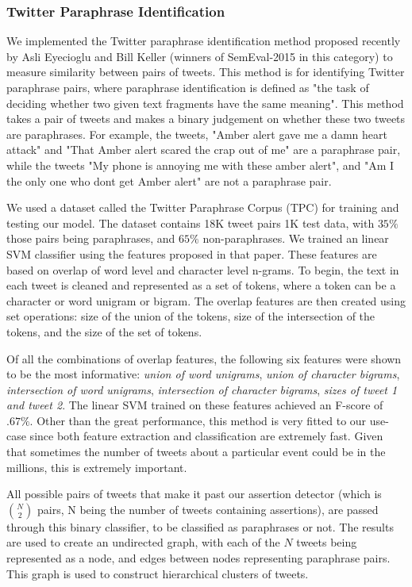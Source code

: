 \documentclass[letterpaper]{article}
\begin{document}
\subsubsection{Twitter Paraphrase Identification}
We implemented the Twitter paraphrase identification method proposed recently by Asli Eyecioglu and Bill Keller \cite{eyecioglu2015asobek} (winners of SemEval-2015 in this category) to measure similarity between pairs of tweets.
This method is for identifying Twitter paraphrase pairs, where paraphrase identification is defined as "the task of deciding whether two given text fragments have the same meaning". This method takes a pair of tweets and makes a binary judgement on whether these two tweets are paraphrases. For example, the tweets, "Amber alert gave me a damn heart attack" and "That Amber alert scared the crap out of me" are a paraphrase pair, while the tweets "My phone is annoying me with these amber alert", and "Am I the only one who dont get Amber alert" are not a paraphrase pair.

We used a dataset called the Twitter Paraphrase Corpus (TPC) \cite{xu2014extracting} for training and testing our model. The dataset contains 18K tweet pairs 1K test data, with $35\%$ those pairs being paraphrases, and $65\%$ non-paraphrases. We trained an linear SVM classifier using the features proposed in that paper. These features are based on overlap of word level and character level n-grams. To begin, the text in each tweet is cleaned and represented as a set of tokens, where a token can be a character or word unigram or bigram. The overlap features are then created using set operations: size of the union of the tokens, size of the intersection of the tokens, and the size of the set of tokens.

Of all the combinations of overlap features, the following six features were shown to be the most informative: \emph{union of word unigrams}, \emph{union of character bigrams}, \emph{intersection of word unigrams}, \emph{intersection of character bigrams}, \emph{sizes of tweet 1 and tweet 2}. The linear SVM trained on these features achieved an F-score of $.67\%$. Other than the great performance, this method is very fitted to our use-case since both feature extraction and classification are extremely fast. Given that sometimes the number of tweets about a particular event could be in the millions, this is extremely important.

All possible pairs of tweets that make it past our assertion detector (which is ${N  \choose 2}$ pairs, N being the number of tweets containing assertions), are passed through this binary classifier, to be classified as paraphrases or not. The results are used to create an undirected graph, with each of the $N$ tweets being represented as a node, and edges between nodes representing paraphrase pairs. This graph is used to construct hierarchical clusters of tweets.
\end{document}
